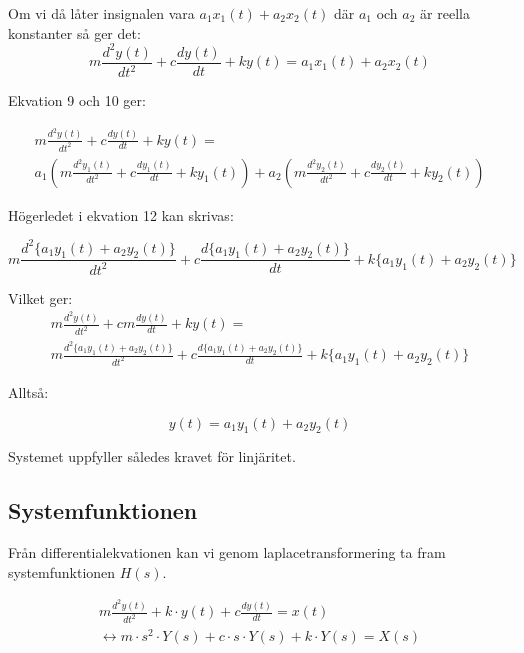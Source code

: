 \documentclass[10pt,a4paper]{article}
\begin{document}
Om vi då låter insignalen vara $a_1 x_1(t) + a_2 x_2(t)$ där $a_1$ och $a_2$ är reella konstanter så ger det:
\begin{equation}
m\frac{d^2y(t)}{dt^2} + c\frac{dy(t)}{dt} + ky(t) = a_1 x_1(t) + a_2 x_2(t)
\end{equation}

Ekvation 9 och 10 ger:

\begin{multline}
m\frac{d^2y(t)}{dt^2} + c\frac{dy(t)}{dt} + ky(t) = \\ a_1(m\frac{d^2y_1(t)}{dt^2} + c\frac{dy_1(t)}{dt} + ky_1(t)) + a_2(m\frac{d^2y_2(t)}{dt^2} + c\frac{dy_2(t)}{dt} + ky_2(t))
\end{multline}

Högerledet i ekvation 12 kan skrivas:

\begin{equation}
m\frac{d^2\{a_1y_1(t) + a_2y_2(t)\}}{dt^2} + c\frac{d\{a_1y_1(t) + a_2y_2(t)\}}{dt} + k\{a_1y_1(t) + a_2y_2(t)\}
\end{equation}

Vilket ger:
\begin{multline}
m\frac{d^2y(t)}{dt^2} + cm\frac{dy(t)}{dt} + ky(t) = \\ m\frac{d^2\{a_1y_1(t) + a_2y_2(t)\}}{dt^2} + c\frac{d\{a_1y_1(t) + a_2y_2(t)\}}{dt} + k\{a_1y_1(t) + a_2y_2(t)\}
\end{multline}

Alltså:

\begin{equation}
y(t) = a_1 y_1(t) + a_2 y_2(t)
\end{equation}

Systemet uppfyller således kravet för linjäritet.

\newpage



\subsection{Systemfunktionen}

Från differentialekvationen kan vi genom laplacetransformering ta fram systemfunktionen $H(s)$.

\begin{multline}
 m\frac{d^2y(t)}{dt^2} + k \cdot y(t) + c\frac{dy(t)}{dt} = x(t) \\ \leftrightarrow m \cdot s^2 \cdot Y(s) + c \cdot s \cdot Y(s) + k \cdot Y(s) = X(s)
\end{multline}
\end{document}

